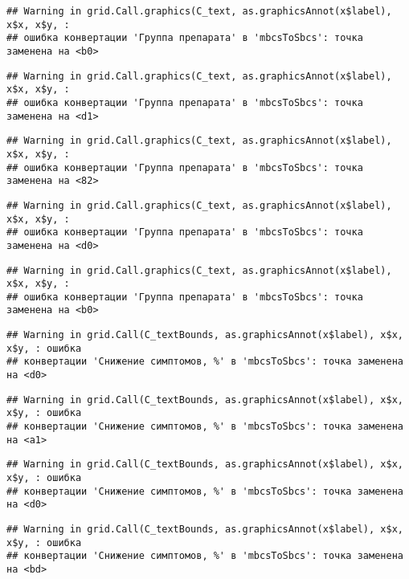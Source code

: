 \documentclass[
]{article}
\begin{document}
\begin{verbatim}
## Warning in grid.Call.graphics(C_text, as.graphicsAnnot(x$label), x$x, x$y, :
## ошибка конвертации 'Группа препарата' в 'mbcsToSbcs': точка заменена на <b0>
\end{verbatim}

\begin{verbatim}
## Warning in grid.Call.graphics(C_text, as.graphicsAnnot(x$label), x$x, x$y, :
## ошибка конвертации 'Группа препарата' в 'mbcsToSbcs': точка заменена на <d1>
\end{verbatim}

\begin{verbatim}
## Warning in grid.Call.graphics(C_text, as.graphicsAnnot(x$label), x$x, x$y, :
## ошибка конвертации 'Группа препарата' в 'mbcsToSbcs': точка заменена на <82>
\end{verbatim}

\begin{verbatim}
## Warning in grid.Call.graphics(C_text, as.graphicsAnnot(x$label), x$x, x$y, :
## ошибка конвертации 'Группа препарата' в 'mbcsToSbcs': точка заменена на <d0>
\end{verbatim}

\begin{verbatim}
## Warning in grid.Call.graphics(C_text, as.graphicsAnnot(x$label), x$x, x$y, :
## ошибка конвертации 'Группа препарата' в 'mbcsToSbcs': точка заменена на <b0>
\end{verbatim}

\begin{verbatim}
## Warning in grid.Call(C_textBounds, as.graphicsAnnot(x$label), x$x, x$y, : ошибка
## конвертации 'Снижение симптомов, %' в 'mbcsToSbcs': точка заменена на <d0>
\end{verbatim}

\begin{verbatim}
## Warning in grid.Call(C_textBounds, as.graphicsAnnot(x$label), x$x, x$y, : ошибка
## конвертации 'Снижение симптомов, %' в 'mbcsToSbcs': точка заменена на <a1>
\end{verbatim}

\begin{verbatim}
## Warning in grid.Call(C_textBounds, as.graphicsAnnot(x$label), x$x, x$y, : ошибка
## конвертации 'Снижение симптомов, %' в 'mbcsToSbcs': точка заменена на <d0>
\end{verbatim}

\begin{verbatim}
## Warning in grid.Call(C_textBounds, as.graphicsAnnot(x$label), x$x, x$y, : ошибка
## конвертации 'Снижение симптомов, %' в 'mbcsToSbcs': точка заменена на <bd>
\end{verbatim}
\end{document}
